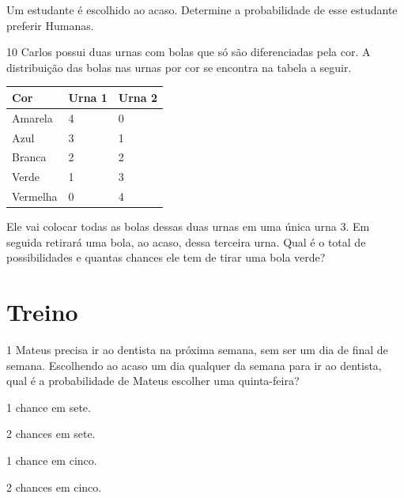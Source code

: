 Um estudante é escolhido ao acaso. Determine a probabilidade de esse
estudante preferir Humanas.

\begin{mdframed}[linewidth=2pt,linecolor=salmao,roundcorner=2pt]


\end{mdframed}

\pagebreak
\num{10} Carlos possui duas urnas com bolas que só são diferenciadas pela cor. A
distribuição das bolas nas urnas por cor se encontra na tabela a
seguir.

\begin{longtable}[]{@{}lll@{}}
\toprule
Cor & Urna 1 & Urna 2\tabularnewline
\midrule
\endhead
Amarela & 4 & 0\tabularnewline
Azul & 3 & 1\tabularnewline
Branca & 2 & 2\tabularnewline
Verde & 1 & 3\tabularnewline
Vermelha & 0 & 4\tabularnewline
\bottomrule
\end{longtable}

Ele vai colocar todas as bolas dessas duas urnas em uma única urna 3. Em
seguida retirará uma bola, ao acaso, dessa terceira urna. Qual é o total de possibilidades e quantas chances ele tem de tirar uma bola verde?

\begin{mdframed}[linewidth=2pt,linecolor=salmao,roundcorner=2pt]


\vspace{1cm}
\end{mdframed}


\section{Treino}

\num{1} Mateus precisa ir ao dentista na próxima semana, sem ser um dia de final de semana. Escolhendo ao acaso um dia
qualquer da semana para ir ao dentista, qual é a probabilidade de Mateus
escolher uma quinta-feira?

\begin{escolha}
\item
  1 chance em sete.
\item
  2 chances em sete.
\item
  1 chance em cinco.
\item
  2 chances em cinco.
\end{escolha}


